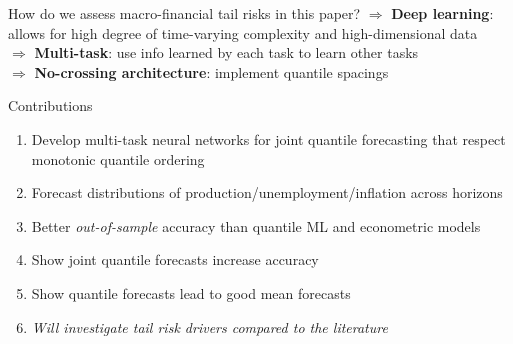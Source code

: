 \documentclass[aspectratio=169]{beamer}
\begin{document}
\begin{frame}{How do we assess macro-financial tail risks in this paper?}
    $\Rightarrow$ \textbf{Deep learning}: allows for high degree of time-varying complexity and high-dimensional data \\
    \vspace{.2cm}
    $\Rightarrow$ \textbf{Multi-task}: use info learned by each task to learn other tasks \parencite{caruanaMultitaskLearning1997} \\%
    \vspace{.2cm}
    $\Rightarrow$ \textbf{No-crossing architecture}: implement quantile spacings \parencite{schmidtQuantileSpacingsSimple2016}\\
    \vspace{.7cm}
\end{frame}



\begin{frame}{Contributions}
	\begin{enumerate}
		\item {Develop multi-task neural networks for joint quantile forecasting that respect monotonic quantile ordering}
        \vspace{.2cm}
		\item {Forecast distributions of production/unemployment/inflation across horizons}
        \vspace{.2cm}
		\item {Better \textit{out-of-sample} accuracy than quantile ML and econometric models}
        \vspace{.2cm}
		\item {Show joint quantile forecasts increase accuracy} %
        \vspace{.2cm}
		\item {Show quantile forecasts lead to good mean forecasts} %
        \vspace{.2cm}
		\item \textit{Will investigate tail risk drivers compared to the literature}
	\end{enumerate}    
\end{frame}
\end{document}
